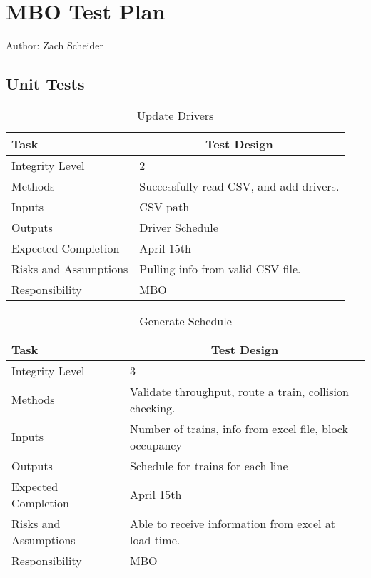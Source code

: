 \documentclass[]{article}
\begin{document}
\section{MBO Test Plan}
Author: Zach Scheider

\subsection{Unit Tests}

\begin{table}[H]
	\centering
	\caption{Update Drivers}
	\begin{tabular}{|l|l|}
		\hline
		Task & \multicolumn{1}{c|}{Test Design} \\ \hline
		Integrity Level & 2 \\ \hline
		Methods & Successfully read CSV, and add drivers. \\ \hline
		Inputs &  CSV path \\ \hline
		Outputs &  Driver Schedule\\ \hline
		Expected Completion & \parbox[t]{10cm}{April 15th}\\ \hline
		Risks and Assumptions & \parbox[t]{10cm}{Pulling info from valid CSV file.} \\ \hline
		Responsibility & MBO\\ \hline
	\end{tabular}
\end{table}

\begin{table}[H]
	\centering
	\caption{Generate Schedule}
	\begin{tabular}{|l|l|}
		\hline
		Task & \multicolumn{1}{c|}{Test Design} \\ \hline
		Integrity Level & 3 \\ \hline
		Methods & Validate throughput, route a train, collision checking. \\ \hline
		Inputs &  Number of trains, info from excel file, block occupancy \\ \hline
		Outputs &  Schedule for trains for each line \\ \hline
		Expected Completion & \parbox[t]{10cm}{April 15th}\\ \hline
		Risks and Assumptions & \parbox[t]{10cm}{Able to receive information from excel at load time.} \\ \hline
		Responsibility & MBO\\ \hline
	\end{tabular}
\end{table}
\end{document}
